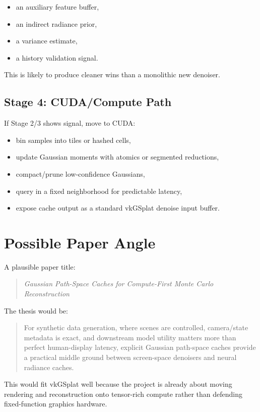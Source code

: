 \documentclass[11pt]{article}
\begin{document}
\begin{itemize}
  \item an auxiliary feature buffer,
  \item an indirect radiance prior,
  \item a variance estimate,
  \item a history validation signal.
\end{itemize}

This is likely to produce cleaner wins than a monolithic new denoiser.

\subsection{Stage 4: CUDA/Compute Path}

If Stage 2/3 shows signal, move to CUDA:

\begin{itemize}
  \item bin samples into tiles or hashed cells,
  \item update Gaussian moments with atomics or segmented reductions,
  \item compact/prune low-confidence Gaussians,
  \item query in a fixed neighborhood for predictable latency,
  \item expose cache output as a standard vkGSplat denoise input buffer.
\end{itemize}

\section{Possible Paper Angle}

A plausible paper title:

\begin{quote}
\emph{Gaussian Path-Space Caches for Compute-First Monte Carlo Reconstruction}
\end{quote}

The thesis would be:

\begin{quote}
For synthetic data generation, where scenes are controlled, camera/state
metadata is exact, and downstream model utility matters more than perfect
human-display latency, explicit Gaussian path-space caches provide a practical
middle ground between screen-space denoisers and neural radiance caches.
\end{quote}

This would fit vkGSplat well because the project is already about moving
rendering and reconstruction onto tensor-rich compute rather than defending
fixed-function graphics hardware.
\end{document}
